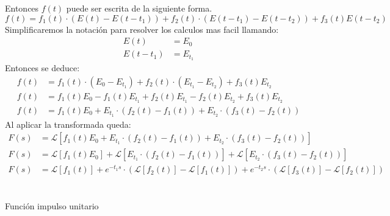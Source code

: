 \documentclass[]{article}
\begin{document}
Entonces $f(t)$ puede ser escrita de la siguiente forma.
$$
f(t) = f_{1}(t)\cdot (E(t)-E(t-t_{1})) + f_{2}(t) \cdot (E(t-t_{1})-E(t-t_{2})) + f_{3}(t)E(t-t_{2})
$$
Simplificaremos la notación para resolver los calculos mas facil llamando:
\begin{align}
E(t) &= E_{0} \\
E(t-t_{1}) &= E_{t_1} 
\end{align}
Entonces se deduce:
\begin{align}
  f(t) &= f_{1}(t)\cdot (E_0-E_{t_1}) + f_{2}(t) \cdot (E_{t_1}-E_{t_2}) + f_{3}(t)E_{t_2} \\
f(t) &= f_1(t)E_{0} - f_1(t)E_{t_{1}} + f_2(t)E_{t_{1}} - f_2(t)E_{t_2} +f_3(t)E_{t_2} \\
f(t) & = f_1(t)E_0 + E_{t_1}\cdot(f_2(t) - f_1(t)) + E_{t_2}\cdot(f_3(t)-f_2(t))
\end{align}
Al aplicar la transformada queda:
\begin{align}
  F(s) &= \mathscr{L}[f_1(t)E_0 + E_{t_1}\cdot(f_2(t) - f_1(t)) + E_{t_2}\cdot(f_3(t)-f_2(t))] \\
  F(s) &= \mathscr{L}[f_1(t)E_0] + \mathscr{L}[E_{t_1}\cdot(f_2(t) - f_1(t))] + \mathscr{L}[ E_{t_2}\cdot(f_3(t)-f_2(t))] \\
  F(s)& = \mathscr{L}[f_1(t)] + e^{-t_1s}\cdot (\mathscr{L}[f_2(t)] - \mathscr{L}[f_1(t)]) + e^{-t_2s} \cdot(\mathscr{L}[f_3(t)]-\mathscr{L}[f_2(t)]) 
\end{align}
\\
\\
\large Función impulso unitario
\\
\normalsize
\end{document}
